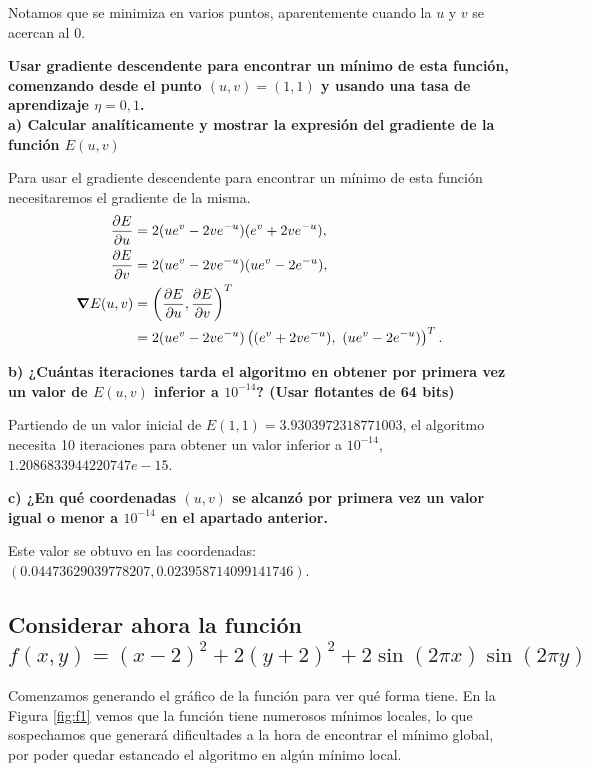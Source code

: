 \documentclass[a4paper, 20pt]{article}
\begin{document}
Notamos que se minimiza en varios puntos, aparentemente cuando la $u$ y $v$ se acercan al 0.

\textbf{Usar gradiente descendente para encontrar un mínimo de esta función, comenzando desde el punto $(u, v) = (1, 1)$ y usando una tasa de aprendizaje $\eta = 0,1$.\\
a) Calcular analíticamente y mostrar la expresión del gradiente de la función $E(u, v)$}

Para usar el gradiente descendente para encontrar un mínimo de esta función necesitaremos el gradiente de  la misma.
\begin{align*}
\pdv{E}{u}(u,v) &= 2(ue^v - 2ve^{-u})(e^v+2ve^{-u}),\\
\pdv{E}{v}(u,v) &= 2(ue^v - 2ve^{-u})(ue^v-2e^{-u}),\\
\grad{E}(u,v) &= \left(\pdv{E}{u}(u,v), \pdv{E}{v}(u,v)\right)^T\\
	      &= 2(ue^v - 2ve^{-u})\left((e^v+2ve^{-u}),\ (ue^v-2e^{-u})\right)^T.
\end{align*}

\textbf{b) ¿Cuántas iteraciones tarda el algoritmo en obtener por primera vez un valor de $E(u, v)$ inferior a $10^{-14}$? (Usar flotantes de 64 bits)}

Partiendo de un valor inicial de $E(1,1) =  3.9303972318771003$, el algoritmo necesita 10 iteraciones para obtener un valor inferior a $10^{-14}$, $1.2086833944220747e-15$.

\textbf{c) ¿En qué coordenadas $(u, v)$ se alcanzó por primera vez un valor igual o menor a $10^{-14}$ en el apartado anterior.}

Este valor se obtuvo en las coordenadas: $(0.04473629039778207,  0.023958714099141746)$.

\subsection{Considerar ahora la función $f(x, y) = (x - 2)^2 + 2(y + 2)^2 + 2 \sin{(2 \pi x)} \sin(2\pi y)$}

Comenzamos generando el gráfico de la función para ver qué forma tiene. En la Figura \ref{fig:f1} vemos que la función tiene numerosos mínimos locales, lo que sospechamos que generará dificultades a la hora de encontrar el mínimo global, por poder quedar estancado el algoritmo en algún mínimo local.
\end{document}
